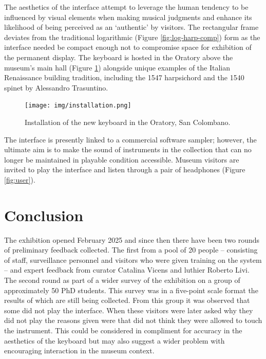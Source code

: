 The aesthetics of the interface attempt to leverage the human tendency to be influenced by visual elements when making musical judgments \cite{tsay_sight_2013, fritz_player_2012,fritz_soloist_2014,fritz_listener_2017} and enhance its likelihood of being perceived as an `authentic' by visitors. The rectangular frame deviates from the traditional logarithmic (Figure \ref{fig:log-harp-comp}) form as the interface needed be compact enough not to compromise space for exhibition of the permanent display. The keyboard is hosted in the Oratory above the museum's main hall (Figure \ref{fig:installed}) alongside unique examples of the Italian Renaissance building tradition, including the 1547 harpsichord and the 1540 spinet by Alessandro Trasuntino.

\begin{figure}
    \centering
    \texttt{[image: img/installation.png]}
    \caption{Installation of the new keyboard in the Oratory, San Colombano.}
    \label{fig:installed}
\end{figure}

The interface is presently linked to a commercial software sampler; however, the ultimate aim is to make the sound of instruments in the collection that can no longer be maintained in playable condition accessible. Museum visitors are invited to play the interface and listen through a pair of headphones (Figure \ref{fig:user}).


\section{Conclusion}

The exhibition opened February 2025 and since then there have been two rounds of preliminary feedback collected. The first from a pool of 20 people -- consisting of staff, surveillance personnel and visitors who were given training on the system -- and expert feedback from curator Catalina Vicens and luthier Roberto Livi. The second round as part of a wider survey of the exhibition on a group of approximately 50 PhD students. This survey was in a five-point scale format the results of which are still being collected. From this group it was observed that some did not play the interface. When these visitors were later asked why they did not play the reasons given were that did not think they were allowed to touch the instrument. This could be considered in compliment for accuracy in the aesthetics of the keyboard but may also suggest a wider problem with  encouraging interaction in the museum context.


